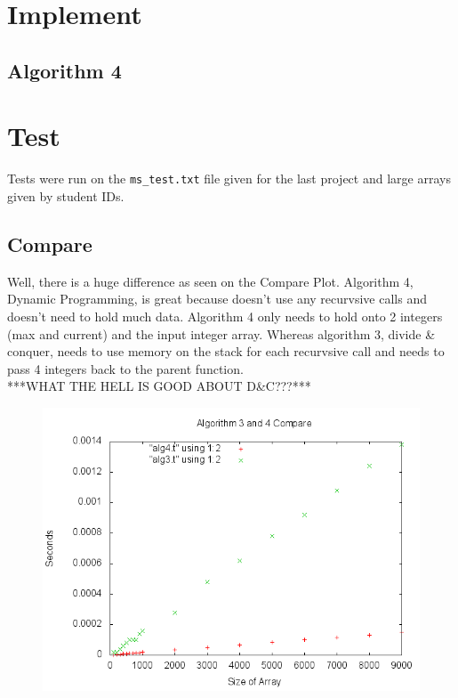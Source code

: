 \documentclass[a4paper,10pt]{article}
\begin{document}
	\section{Implement}
		\subsection{Algorithm 4}
		


	\section{Test}
		Tests were run on the {\tt ms\_test.txt} file given for the last project and large arrays given by student IDs.


\begin{samepage} 
	\section{Compare}
		Well, there is a huge difference as seen on the Compare Plot.
		Algorithm 4, Dynamic Programming, is great because doesn't use any recurvsive calls and doesn't need to hold much data.
		Algorithm 4 only needs to hold onto 2 integers (max and current) and the input integer array.  
		Whereas algorithm 3, divide \& conquer, needs to use memory on the stack for each recurvsive call and needs to pass 4 integers back to the parent function.\\
		***WHAT THE HELL IS GOOD ABOUT D\&C???***
		\begin{figure}[!htb]
			\centering
			\includegraphics[scale=.5]{timingfiles/algCompareplot.png}
		\end{figure}
\end{samepage} 

		
		
\end{document}
